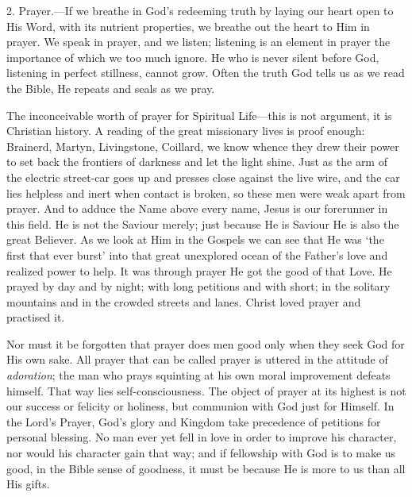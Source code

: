 \documentclass[12pt,a5paper]{article}
\begin{document}
2. Prayer.---If we breathe in God's redeeming truth by laying our heart open to His Word, with its nutrient properties, we breathe out the heart to Him in prayer. We speak in prayer, and we listen; listening is an element in prayer the importance of which we too much ignore. He who is never silent before God, listening in perfect stillness, cannot grow. Often the truth God tells us as we read the Bible, He repeats and seals as we pray. 

The inconceivable worth of prayer for Spiritual Life---this is not argument, it is Christian history. A reading of the great missionary lives is proof enough: Brainerd, Martyn, Livingstone, Coillard, we know whence they drew their power to set back the frontiers of darkness and let the light shine. Just as the arm of the electric street-car goes up and presses close against the live wire, and the car lies helpless and inert when contact is broken, so these men were weak apart from prayer. And to adduce the Name above every name, Jesus is our forerunner in this field. He is not the Saviour merely; just because He is Saviour He is also the great Believer. As we look at Him in the Gospels we can see that He was `the first that ever burst' into that great unexplored ocean of the Father's love and realized power to help. It was through prayer He got the good of that Love. He prayed by day and by night; with long petitions and with short; in the solitary mountains and in the crowded streets and lanes. Christ loved prayer and practised it. 

Nor must it be forgotten that prayer does men good only when they seek God for His own sake. All prayer that can be called prayer is uttered in the attitude of \textit{adoration}; the man who prays squinting at his own moral improvement defeats himself. That way lies self-consciousness. The object of prayer at its highest is not our success or felicity or holiness, but communion with God just
for Himself. In the Lord's Prayer, God's glory and Kingdom take precedence of petitions for personal blessing. No man ever yet fell in love in order to improve his character, nor would his character gain that way; and if fellowship with God is to make us good, in the Bible sense of goodness, it must be because He is more to us than all His gifts. 
\end{document}
